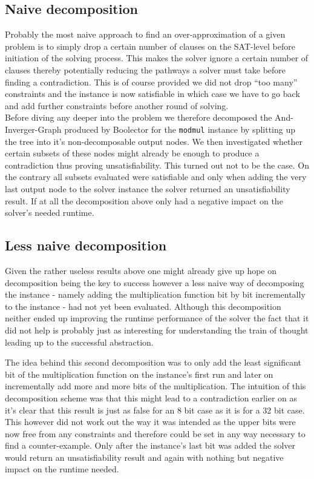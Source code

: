 \subsection{Naive decomposition}
Probably the most naive approach to find an over-approximation of a given problem is to simply drop a certain number of clauses on the SAT-level before initiation of the solving process. This makes the solver ignore a certain number of clauses thereby potentially reducing the pathways a solver must take before finding a contradiction. This is of course provided we did not drop \enquote{too many} constraints and the instance is now satisfiable in which case we have to go back and add further constraints before another round of solving.\\
Before diving any deeper into the problem we therefore decomposed the And-Inverger-Graph  produced by Boolector for the \texttt{modmul} instance by splitting up the tree into it's non-decomposable output nodes. We then investigated whether certain subsets of these nodes might already be enough to produce a contradiction thus proving unsatisfiability. This turned out not to be the case. On the contrary all subsets evaluated were satisfiable and only when adding the very last output node to the solver instance the solver returned an unsatisfiability result. If at all the decomposition above only had a negative impact on the solver's needed runtime.

\subsection{Less naive decomposition}

Given the rather useless results above one might already give up hope on decomposition being the key to success however a less naive way of decomposing the instance - namely adding the multiplication function bit by bit incrementally to the instance - had not yet been evaluated. Although this decomposition neither ended up improving the runtime performance of the solver the fact that it did not help is probably just as interesting for understanding the train of thought leading up to the successful abstraction. 
\par
The idea behind this second decomposition was to only add the least significant bit of the multiplication function on the instance's first run and later on incrementally add more and more bits of the multiplication. The intuition of this decomposition scheme was that this might lead to a contradiction earlier on as it's clear that this result is just as false for an 8 bit case as it is for a 32 bit case. This however did not work out the way it was intended as the upper bits were now free from any constraints and therefore could be set in any way necessary to find a counter-example. Only after the instance's last bit was added the solver would return an unsatisfiability result and again with nothing but negative impact on the runtime needed.


